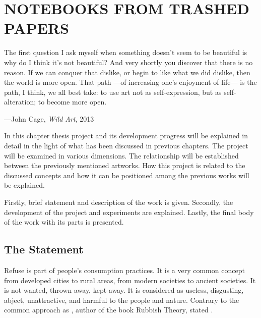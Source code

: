 \chapter{NOTEBOOKS FROM TRASHED PAPERS}





\begin{singlespace}
\epigraph{The first question I ask myself when something doesn't seem to be beautiful is why do I think it's not beautiful? And very shortly you discover that there is no reason. If we can conquer that dislike, or begin to like what we did dislike, then the world is more open. That path ---of increasing one's enjoyment of life--- is the path, I think, we all best take: to use art not as self-expression, but as self-alteration; to become more open.}{\hfill---John Cage, \textit{Wild Art}, 2013}
\end{singlespace}





In this chapter thesis project and its development progress will be explained in detail in the light of what has been discussed in previous chapters. The project will be examined in various dimensions. The relationship will be established between the previously mentioned artworks. How this project is related to the discussed concepts and how it can be positioned among the previous works will be explained.

Firstly, brief statement and description of the work is given. Secondly, the development of the project and experiments are explained. Lastly, the final body of the work with its parts is presented.





%
%
\section{The Statement}
Refuse is part of people’s consumption practices. It is a very common concept from developed cities to rural areas, from modern societies to ancient societies. It is not wanted, thrown away, kept away. It is considered as useless, disgusting, abject, unattractive, and harmful to the people and nature. Contrary to the common approach as \cite{thompson1979rubbish}, author of the book Rubbish Theory, stated .

